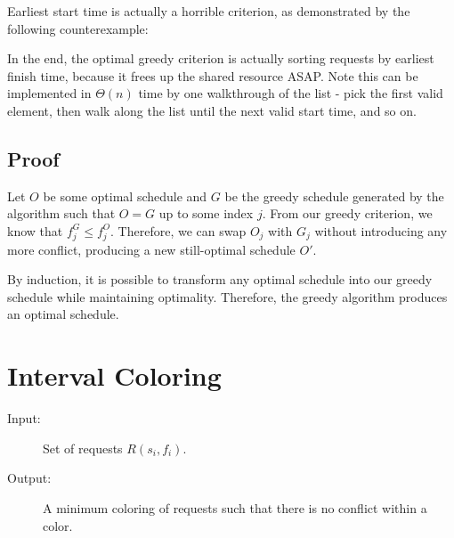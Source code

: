 \documentclass[11pt]{article}
\begin{document}
		Earliest start time is actually a horrible criterion, as demonstrated by the following counterexample:
		
		\begin{center}
		\end{center}
		
		In the end, the optimal greedy criterion is actually sorting requests by earliest finish time, because it frees up the shared resource ASAP. Note this can be implemented in $\Theta(n)$ time by one walkthrough of the list - pick the first valid element, then walk along the list until the next valid start time, and so on.
		
	\subsection{Proof}
		Let $O$ be some optimal schedule and $G$ be the greedy schedule generated by the algorithm such that $O = G$ up to some index $j$. From our greedy criterion, we know that $f_j^G \leq f_j^O$. Therefore, we can swap $O_j$ with $G_j$ without introducing any more conflict, producing a new still-optimal schedule $O'$.
		
		By induction, it is possible to transform any optimal schedule into our greedy schedule while maintaining optimality. Therefore, the greedy algorithm produces an optimal schedule.
		
\section{Interval Coloring}
	\begin{description}
		\item[Input:] Set of requests $R(s_i, f_i)$.
		\item[Output:] A minimum coloring of requests such that there is no conflict within a color.
	\end{description}
		
\end{document}
